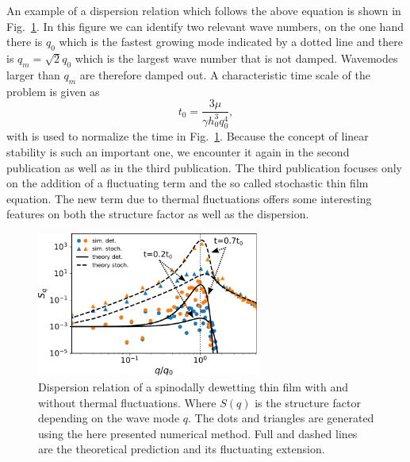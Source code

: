 An example of a dispersion relation which follows the above equation is shown in Fig.~\ref{fig:dispertion_1}.
In this figure we can identify two relevant wave numbers, on the one hand there is $q_0$ which is the fastest growing mode indicated by a dotted line and there is $q_m = \sqrt{2}q_0$ which is the largest wave number that is not damped.
Wavemodes larger than $q_m$ are therefore damped out.
A characteristic time scale of the problem is given as
\begin{equation}
    t_0 = \frac{3\mu}{\gamma h_0^3 q_0^4},
\end{equation}
with is used to normalize the time in Fig.~\ref{fig:dispertion_1}.
Because the concept of linear stability is such an important one, we encounter it again in the second publication as well as in the third publication.
The third publication focuses only on the addition of a fluctuating term and the so called stochastic thin film equation.
The new term due to thermal fluctuations offers some interesting features on both the structure factor as well as the dispersion.

\begin{figure}
    \centering
    \includegraphics[width=0.65\textwidth]{graphics/spectratheta20.pdf}
    \caption{Dispersion relation of a spinodally dewetting thin film with and without thermal fluctuations.
    Where $S(q)$ is the structure factor depending on the wave mode $q$.
    The dots and triangles are generated using the here presented numerical method. 
    Full and dashed lines are the theoretical prediction and its fluctuating extension.
    }
    \label{fig:dispertion_1}
\end{figure}

